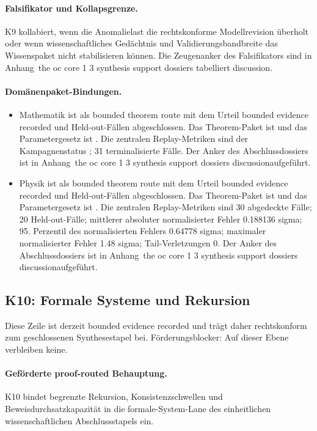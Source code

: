 \paragraph{Falsifikator und Kollapsgrenze.}
K9 kollabiert, wenn die Anomalielast die rechtskonforme Modellrevision überholt oder wenn wissenschaftliches Gedächtnis und Validierungsbandbreite das Wissenspaket nicht stabilisieren können.
Die Zeugenanker des Falsifikators sind in Anhang~the oc core 1 3 synthesis support dossiers tabelliert discussion.

\paragraph{Domänenpaket-Bindungen.}
\begin{itemize}[leftmargin=1.6em,nosep]
\item Mathematik ist als bounded theorem route mit dem Urteil bounded evidence recorded und  Held-out-Fällen abgeschlossen. Das Theorem-Paket ist  und das Parametergesetz ist . Die zentralen Replay-Metriken sind der Kampagnenstatus ; 31 terminalisierte Fälle. Der Anker des Abschlussdossiers ist in Anhang~the oc core 1 3 synthesis support dossiers discussionaufgeführt.
\item Physik ist als bounded theorem route mit dem Urteil bounded evidence recorded und  Held-out-Fällen abgeschlossen. Das Theorem-Paket ist  und das Parametergesetz ist . Die zentralen Replay-Metriken sind 30 abgedeckte Fälle; 20 Held-out-Fälle; mittlerer absoluter normalisierter Fehler 0.188136 sigma; 95. Perzentil des normalisierten Fehlers 0.64778 sigma; maximaler normalisierter Fehler 1.48 sigma; Tail-Verletzungen 0. Der Anker des Abschlussdossiers ist in Anhang~the oc core 1 3 synthesis support dossiers discussionaufgeführt.
\end{itemize}

\subsection{K10: Formale Systeme und Rekursion}
\label{sec:oc-core-1-3-synthesis-k10}
Diese Zeile ist derzeit bounded evidence recorded und trägt daher rechtskonform zum geschlossenen Synthesestapel bei.
Förderungsblocker: Auf dieser Ebene verbleiben keine.

\paragraph{Geförderte proof-routed Behauptung.}
K10 bindet begrenzte Rekursion, Konsistenzschwellen und Beweisdurchsatzkapazität in die formale-System-Lane des einheitlichen wissenschaftlichen Abschlussstapels ein.

